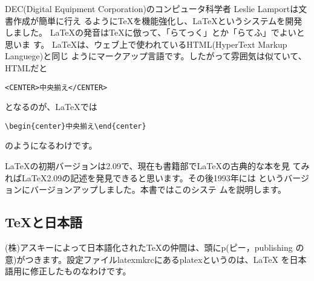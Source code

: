 DEC(Digital Equipment Corporation)のコンピュータ科学者
Leslie Lamportは文書作成が簡単に行え
るように{\TeX}を機能強化し、{\LaTeX}というシステムを開発しました。
{\LaTeX}の発音は{\TeX}に倣って、「らてっく」とか「らてふ」でよいと思いま
す。
{\LaTeX}は、ウェブ上で使われているHTML(HyperText Markup Languege)と同じ
ようにマークアップ言語です。したがって雰囲気は似ていて、HTMLだと
\begin{screen}
\begin{verbatim}
<CENTER>中央揃え</CENTER>
\end{verbatim}
\end{screen}
となるのが、{\LaTeX}では
\begin{screen}
\begin{verbatim}
\begin{center}中央揃え\end{center}
\end{verbatim}
\end{screen}
のようになるわけです。

{\LaTeX}の初期バージョンは2.09で、現在も書籍部で{\LaTeX}の古典的な本を見
てみれば{\LaTeX}2.09の記述を発見できると思います。その後1993年には
{\LaTeXe}というバージョンにバージョンアップしました。本書ではこのシステ
ムを説明します。

\subsection{\TeX と日本語}
(株)アスキーによって日本語化された{\TeX}の仲間は、頭にp(ピー，publishing
の意)がつきます。設定ファイルlatexmkrcにあるplatexというのは、{\LaTeX} を日本
語用に修正したものなわけです。

\pagebreak
